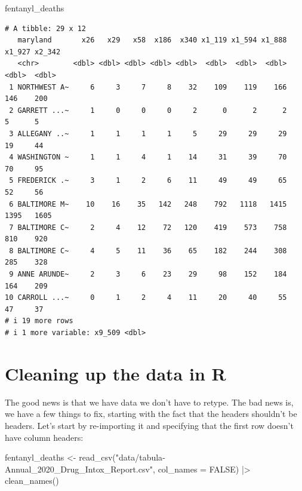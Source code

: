 \documentclass[
  letterpaper,
  DIV=11,
  numbers=noendperiod]{scrreprt}
\newenvironment{Shaded}{\begin{snugshade}}{\end{snugshade}}
\newcommand{\AttributeTok}[1]{\textcolor[rgb]{0.40,0.45,0.13}{#1}}
\newcommand{\ConstantTok}[1]{\textcolor[rgb]{0.56,0.35,0.01}{#1}}
\newcommand{\FunctionTok}[1]{\textcolor[rgb]{0.28,0.35,0.67}{#1}}
\newcommand{\NormalTok}[1]{\textcolor[rgb]{0.00,0.23,0.31}{#1}}
\newcommand{\OtherTok}[1]{\textcolor[rgb]{0.00,0.23,0.31}{#1}}
\newcommand{\SpecialCharTok}[1]{\textcolor[rgb]{0.37,0.37,0.37}{#1}}
\newcommand{\StringTok}[1]{\textcolor[rgb]{0.13,0.47,0.30}{#1}}
\begin{document}
\begin{Shaded}
\begin{Highlighting}[]
\NormalTok{fentanyl\_deaths}
\end{Highlighting}
\end{Shaded}

\begin{verbatim}
# A tibble: 29 x 12
   maryland       x26   x29   x58  x186  x340 x1_119 x1_594 x1_888 x1_927 x2_342
   <chr>        <dbl> <dbl> <dbl> <dbl> <dbl>  <dbl>  <dbl>  <dbl>  <dbl>  <dbl>
 1 NORTHWEST A~     6     3     7     8    32    109    119    166    146    200
 2 GARRETT ...~     1     0     0     0     2      0      2      2      5      5
 3 ALLEGANY ..~     1     1     1     1     5     29     29     29     19     44
 4 WASHINGTON ~     1     1     4     1    14     31     39     70     70     95
 5 FREDERICK .~     3     1     2     6    11     49     49     65     52     56
 6 BALTIMORE M~    10    16    35   142   248    792   1118   1415   1395   1605
 7 BALTIMORE C~     2     4    12    72   120    419    573    758    810    920
 8 BALTIMORE C~     4     5    11    36    65    182    244    308    285    328
 9 ANNE ARUNDE~     2     3     6    23    29     98    152    184    164    209
10 CARROLL ...~     0     1     2     4    11     20     40     55     47     37
# i 19 more rows
# i 1 more variable: x9_509 <dbl>
\end{verbatim}

\hypertarget{cleaning-up-the-data-in-r}{%
\section{Cleaning up the data in R}\label{cleaning-up-the-data-in-r}}

The good news is that we have data we don't have to retype. The bad news
is, we have a few things to fix, starting with the fact that the headers
shouldn't be headers. Let's start by re-importing it and specifying that
the first row doesn't have column headers:

\begin{Shaded}
\begin{Highlighting}[]
\NormalTok{fentanyl\_deaths }\OtherTok{\textless{}{-}} \FunctionTok{read\_csv}\NormalTok{(}\StringTok{"data/tabula{-}Annual\_2020\_Drug\_Intox\_Report.csv"}\NormalTok{, }\AttributeTok{col\_names =} \ConstantTok{FALSE}\NormalTok{) }\SpecialCharTok{|\textgreater{}} \FunctionTok{clean\_names}\NormalTok{()}
\end{Highlighting}
\end{Shaded}
\end{document}
